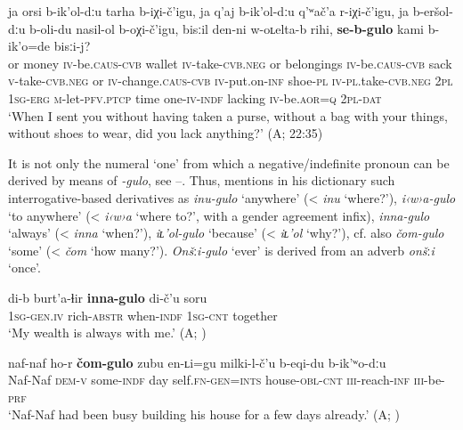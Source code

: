 \documentclass[output=paper,colorlinks=true, citecolor=brown]{langscibook}
\begin{document}
\ea
    \label{ex:and:52}
    \gll ja orsi b{}-ik’ol{}-dːu tarha b{}-iχi{}-č’igu, ja q’aj b{}-ik’ol{}-dːu q’ʷač’a r{}-iχi{}-č’igu, ja b{}-eršol{}-dːu b{}-oli{}-du nasil{}-ol b{}-oχi{}-č’igu, bisːil den{}-ni w{}-oʟelta{}-b rihi,  \textbf{se{}-b{}-gulo} kami b{}-ik’o=de bisːi{}-j? \\
          or money \textsc{iv}{}-be.\textsc{caus-cvb} wallet \textsc{iv}{}-take-\textsc{cvb.neg} or belongings \textsc{iv}{}-be.\textsc{caus-cvb} sack \textsc{v}{}-take-\textsc{cvb.neg} or \textsc{iv}{}-change.\textsc{caus-cvb} \textsc{iv}{}-put.on-\textsc{inf} shoe-\textsc{pl} \textsc{iv}{}-\textsc{pl}.take-\textsc{cvb.neg} \textsc{2pl} \textsc{1sg}-\textsc{erg} \textsc{m}{}-let-\textsc{pfv.ptcp} time one-\textsc{iv-indf} lacking \textsc{iv}{}-be.\textsc{aor=q} \textsc{2pl-dat} \\
    \glt ‘When I sent you without having taken a purse, without a bag with your things, without shoes to wear, did you lack anything?’ (A;  22:35)
\z 

It is not only the numeral ‘one’ from which a negative/indefinite pronoun can be derived by means of \textit{{}-gulo}, see --. Thus, \citet{Salimov2010} mentions in his dictionary such interrogative-based derivatives as \textit{inu-gulo} ‘anywhere’ (< \textit{inu} ‘where?’), \textit{i‹w›a{}-gulo} ‘to anywhere’ (< \textit{i‹w›a} ‘where to?’, with a gender agreement infix), \textit{inna-gulo} ‘always’ (< \textit{inna} ‘when?’), \textit{iʟ’ol-gulo} ‘because’ (< \textit{iʟ’ol} ‘why?’), cf. also \textit{čom-gulo} ‘some’ (< \textit{čom} ‘how many?’). \textit{Onš}\textbf{ː}\textit{i-gulo} ‘ever’ is derived from an adverb \textit{onš}\textbf{ː}\textit{i} ‘once’. 

\ea
    \label{ex:and:53} 
    \gll di{}-b burt’a{}-ɬir \textbf{inna{}-gulo} di{}-č’u soru\\
          \textsc{1sg}-\textsc{gen.iv} rich-\textsc{abstr} when-\textsc{indf} \textsc{1sg}-\textsc{cnt} together\\
    \glt ‘My wealth is always with me.’ (A; )
\z 


\ea
    \label{ex:and:54} 
    \gll naf-naf ho{}-r \textbf{čom{}-gulo} zubu en{}-ʟi=gu milki{}-l{}-č’u b-eqi-du b-ik’ʷo-dːu \\
          Naf-Naf \textsc{dem-v} some-\textsc{indf} day self.\textsc{fn}{}-\textsc{gen=ints} house-\textsc{obl}{}-\textsc{cnt} \textsc{iii}{}-reach-\textsc{inf} \textsc{iii}{}-be-\textsc{prf} \\
    \glt ‘Naf-Naf had been busy building his house for a few days already.’ (A; )
\z 
\end{document}
